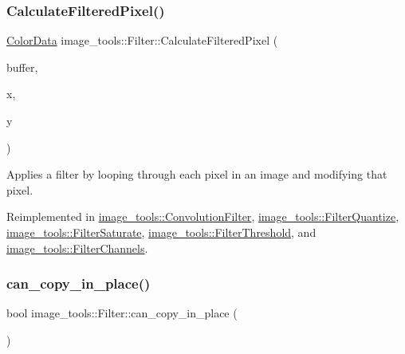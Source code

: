 \subsubsection{\texorpdfstring{Calculate\+Filtered\+Pixel()}{CalculateFilteredPixel()}}
{\footnotesize\ttfamily \hyperlink{classimage__tools_1_1ColorData}{Color\+Data} image\+\_\+tools\+::\+Filter\+::\+Calculate\+Filtered\+Pixel (\begin{DoxyParamCaption}\item[{\hyperlink{classimage__tools_1_1PixelBuffer}{Pixel\+Buffer} $\ast$}]{buffer,  }\item[{int}]{x,  }\item[{int}]{y }\end{DoxyParamCaption})\hspace{0.3cm}{\ttfamily [virtual]}}

Applies a filter by looping through each pixel in an image and modifying that pixel. 

Reimplemented in \hyperlink{classimage__tools_1_1ConvolutionFilter_a2d35a2e2a2d1303d0a6824b16406d97b}{image\+\_\+tools\+::\+Convolution\+Filter}, \hyperlink{classimage__tools_1_1FilterQuantize_a312afa1aa4af5c58b7ec6d5faad0a176}{image\+\_\+tools\+::\+Filter\+Quantize}, \hyperlink{classimage__tools_1_1FilterSaturate_a86ab1b87e52a5f9b5c8642531ed7fdc6}{image\+\_\+tools\+::\+Filter\+Saturate}, \hyperlink{classimage__tools_1_1FilterThreshold_a905065fd47d7228b11354795e487b2c6}{image\+\_\+tools\+::\+Filter\+Threshold}, and \hyperlink{classimage__tools_1_1FilterChannels_a99af7bdf46f4d606fae4baa793025836}{image\+\_\+tools\+::\+Filter\+Channels}.

\mbox{\label{classimage__tools_1_1Filter_abb21c6ce1f09a4ce4fbd38255c44d281}} 
\subsubsection{\texorpdfstring{can\+\_\+copy\+\_\+in\+\_\+place()}{can\_copy\_in\_place()}}
{\footnotesize\ttfamily bool image\+\_\+tools\+::\+Filter\+::can\+\_\+copy\+\_\+in\+\_\+place (\begin{DoxyParamCaption}{ }\end{DoxyParamCaption})\hspace{0.3cm}{\ttfamily [virtual]}}

